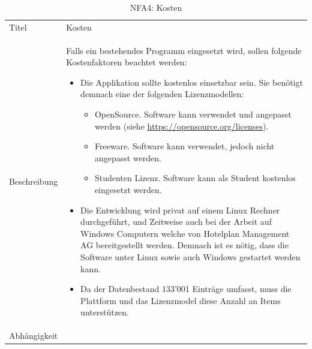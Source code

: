  \begin{table}[H] 
	\caption{NFA4: Kosten}
	\centering
	\label{fig:anforderungsanalyse:nichtfunktionaleanforderung:nfa4}
	\begin{tabular}{ | l | L{10cm} | } 
		\hline 
		 \\ \hline 
		Titel & Kosten \\ \hline 
		Beschreibung & Falls ein bestehendes Programm eingesetzt wird, sollen folgende Kostenfaktoren beachtet werden: 
		\begin{itemize}
		\item Die Applikation sollte kostenlos einsetzbar sein. Sie benötigt demnach eine der folgenden Lizenzmodellen:
		\begin{itemize}
		\item OpenSource. Software kann verwendet und angepasst werden (siehe \url{https://opensource.org/licenses}).
		\item Freeware. Software kann verwendet, jedoch nicht angepasst werden.
		\item Studenten Lizenz. Software kann als Student kostenlos eingesetzt werden.
		\end{itemize}
		\item Die Entwicklung wird privat auf einem Linux Rechner durchgeführt, und Zeitweise auch bei der Arbeit auf Windows Computern welche von Hotelplan Management AG bereitgestellt werden.
		Demnach ist es nötig, dass die Software unter Linux sowie auch Windows gestartet werden kann.
		\item Da der Datenbestand 133'001 Einträge umfasst, muss die Plattform und das Lizenzmodel diese Anzahl an Items unterstützen.
		\end{itemize}\\ \hline 
		Abhängigkeit & \\ \hline 
	\end{tabular}
\end{table}

